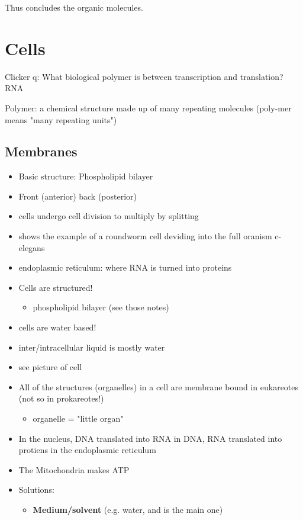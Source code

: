 \documentclass{article}
\theoremstyle{definition}
\begin{document}
Thus concludes the organic molecules.

\section{Cells}
Clicker q: What biological polymer is between transcription and translation? RNA

Polymer: a chemical structure made up of many repeating molecules (poly-mer means "many repeating units")

\subsection{Membranes}

\begin{itemize}
	\item Basic structure: Phospholipid bilayer
	\item Front (anterior) back (posterior)
	\item cells undergo cell division to multiply by splitting
	\item shows the example of a roundworm cell deviding into the full oranism c-elegans
	\item endoplasmic reticulum: where RNA is turned into proteins
	\item Cells are structured!
		\begin{itemize}
			\item phospholipid bilayer (see those notes)
		\end{itemize}
	\item cells are water based!
	\item inter/intracellular liquid is mostly water
	\item see  picture of cell
	\item All of the structures (organelles) in a cell are membrane bound in eukareotes (not so in prokareotes!)
		\begin{itemize}
			\item organelle = "little organ"
		\end{itemize}
	\item In the nucleus, DNA translated into RNA in DNA, RNA translated into protiens in the endoplasmic reticulum
	\item The Mitochondria makes ATP
	\item Solutions:
		\begin{itemize}
			\item \textbf{Medium/solvent} (e.g. water, and is the main one)
				\begin{itemize}

\end{itemize}
\end{itemize}
\end{itemize}
\end{document}
